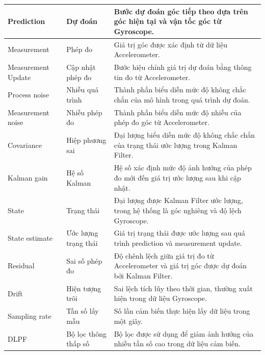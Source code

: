\documentclass[a4paper,12pt]{report}
\begin{document}
\begin{longtable}{|p{3.5cm}|p{3.5cm}|p{7cm}|}
    Prediction &
    Dự đoán &
    Bước dự đoán góc tiếp theo dựa trên góc hiện tại và vận tốc góc từ Gyroscope. \\
    \hline

    Measurement &
    Phép đo &
    Giá trị góc được xác định từ dữ liệu Accelerometer. \\
    \hline

    Measurement Update &
    Cập nhật phép đo &
    Bước hiệu chỉnh giá trị dự đoán bằng thông tin đo từ Accelerometer. \\
    \hline

    Process noise &
    Nhiễu quá trình &
    Thành phần biểu diễn mức độ không chắc chắn của mô hình trong quá trình dự đoán. \\
    \hline

    Measurement noise &
    Nhiễu phép đo &
    Thành phần biểu diễn mức độ nhiễu của phép đo góc từ Accelerometer. \\
    \hline

    Covariance &
    Hiệp phương sai &
    Đại lượng biểu diễn mức độ không chắc chắn của trạng thái ước lượng trong Kalman Filter. \\
    \hline

    Kalman gain &
    Hệ số Kalman &
    Hệ số xác định mức độ ảnh hưởng của phép đo mới đến giá trị ước lượng sau khi cập nhật. \\
    \hline

    State &
    Trạng thái &
    Đại lượng được Kalman Filter ước lượng, trong hệ thống là góc nghiêng và độ lệch Gyroscope. \\
    \hline

    State estimate &
    Ước lượng trạng thái &
    Giá trị trạng thái được ước lượng sau quá trình prediction và measurement update. \\
    \hline

    Residual &
    Sai số phép đo &
    Độ chênh lệch giữa giá trị đo từ Accelerometer và giá trị góc được dự đoán bởi Kalman Filter. \\
    \hline
    
    Drift &
    Hiện tượng trôi &
    Sai lệch tích lũy theo thời gian, thường xuất hiện trong dữ liệu Gyroscope. \\
    \hline

    Sampling rate &
    Tần số lấy mẫu &
    Số lần cảm biến thực hiện lấy dữ liệu trong một giây. \\
    \hline

    DLPF &
    Bộ lọc thông thấp số &
    Bộ lọc được sử dụng để giảm ảnh hưởng của nhiễu tần số cao trong dữ liệu cảm biến. \\
    \hline


\end{longtable}
\end{document}
